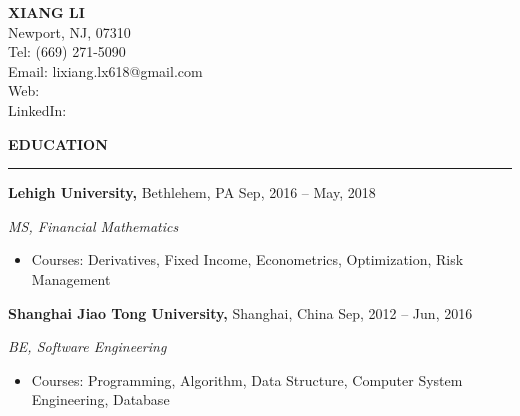 \documentclass[a4paper,12pt]{report}
\newcommand{\marginAdj}{0.5in}
\begin{document}
\sloppy
{\centering
 \fontsize{14pt}{14pt}\selectfont\textbf{XIANG LI}\\
 \fontsize{13pt}{13pt}\selectfont Newport, NJ, 07310 \\
 \fontsize{13pt}{13pt}\selectfont Tel: (669) 271-5090 \\
 \fontsize{13pt}{13pt}\selectfont Email: lixiang.lx618@gmail.com \\
 \fontsize{13pt}{13pt}\selectfont Web: \href{https://github.com/LiXiang618}{}\\
 \fontsize{13pt}{13pt}\selectfont LinkedIn:
 \href{https://www.linkedin.com/in/LiXiang618}{} \\
}

\vspace{9pt}



\noindent 
\textbf{EDUCATION} \par
\vspace{2pt}
\hrule
\vspace{6pt}
\noindent 
\textbf{Lehigh University, }Bethlehem, PA{\fontsize{9pt}{9pt}\selectfont \textbf{ \hspace*{2.85in} \hspace*{\marginAdj} }{\fontsize{12pt}{12pt}\selectfont Sep, 2016 – May, 2018}} \par
\noindent 
{\fontsize{12pt}{12pt}\selectfont \textit{MS, Financial Mathematics}} \par
\noindent 
\begin{itemize}[noitemsep,topsep=0pt]
\item {\fontsize{12pt}{12pt}\selectfont Courses: Derivatives, Fixed Income, Econometrics, Optimization, Risk Management} \par
\end{itemize}
 \par
\noindent 
\textbf{Shanghai Jiao Tong University, }Shanghai, China{\fontsize{9pt}{9pt}\selectfont  \hspace*{1.95in} \hspace*{\marginAdj} {\fontsize{12pt}{12pt}\selectfont Sep, 2012 – Jun, 2016}} \par
\noindent 
{\fontsize{12pt}{12pt}\selectfont \textit{BE, Software Engineering}} \par
\noindent 
\begin{itemize}[noitemsep,topsep=0pt]
\item {\fontsize{12pt}{12pt}\selectfont Courses: Programming, Algorithm, Data Structure, Computer System Engineering, Database} \par
\end{itemize}
 \par
 \vspace{9pt}
 
\end{document}

